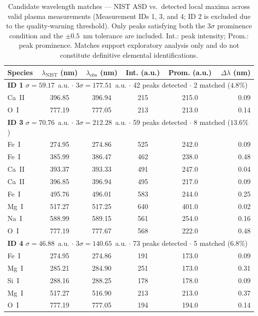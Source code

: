 \documentclass[final,5p,twocolumn,a4paper]{elsarticle}
\begin{document}
\begin{table}[!htbp]
\centering
\footnotesize
\setlength{\tabcolsep}{6pt}
\begin{tabular}{@{}lccccr@{}}
\toprule
\textbf{Species} & \textbf{$\lambda_{\mathrm{NIST}}$ (nm)} & \textbf{$\lambda_{\mathrm{obs}}$ (nm)} & \textbf{Int. (a.u.)} & \textbf{Prom. (a.u.)} & \textbf{$\Delta\lambda$ (nm)} \\
\midrule
\multicolumn{6}{l}{\textbf{ID 1} \quad $\sigma = 59.17$~a.u. $\cdot$ $3\sigma = 177.51$~a.u. $\cdot$ 42 peaks detected $\cdot$ 2 matched ($4.8\%$)} \\
\midrule
Ca~II & 396.85 & 396.94 & 215 & 215.0 & 0.09 \\
O~I   & 777.19 & 777.05 & 213 & 213.0 & 0.14 \\
\midrule
\multicolumn{6}{l}{\textbf{ID 3} \quad $\sigma = 70.76$~a.u. $\cdot$ $3\sigma = 212.28$~a.u. $\cdot$ 59 peaks detected $\cdot$ 8 matched ($13.6\%$)} \\
\midrule
Fe~I  & 274.95 & 274.86 & 525 & 242.0 & 0.09 \\
Fe~I  & 385.99 & 386.47 & 462 & 238.0 & 0.48 \\
Ca~II & 393.37 & 393.33 & 491 & 247.0 & 0.04 \\
Ca~II & 396.85 & 396.94 & 495 & 217.0 & 0.09 \\
Fe~I  & 495.76 & 496.01 & 583 & 244.0 & 0.25 \\
Mg~I  & 517.27 & 517.25 & 640 & 401.0 & 0.02 \\
Na~I  & 588.99 & 589.15 & 561 & 254.0 & 0.16 \\
O~I   & 777.19 & 777.67 & 568 & 222.0 & 0.48 \\
\midrule
\multicolumn{6}{l}{\textbf{ID 4} \quad $\sigma = 46.88$~a.u. $\cdot$ $3\sigma = 140.65$~a.u. $\cdot$ 73 peaks detected $\cdot$ 5 matched ($6.8\%$)} \\
\midrule
Fe~I  & 274.95 & 274.86 & 191 & 173.0 & 0.09 \\
Mg~I  & 285.21 & 284.90 & 251 & 173.0 & 0.31 \\
Si~I  & 288.16 & 288.25 & 178 & 178.0 & 0.09 \\
Mg~I  & 517.27 & 516.90 & 213 & 213.0 & 0.37 \\
O~I   & 777.19 & 777.05 & 194 & 194.0 & 0.14 \\
\bottomrule
\end{tabular}
\caption{Candidate wavelength matches --- NIST ASD vs.\ detected local maxima across valid plasma measurements (Measurement IDs 1, 3, and 4; ID 2 is excluded due to the quality-warning threshold). Only peaks satisfying both the $3\sigma$ prominence condition and the $\pm0.5$~nm tolerance \cite{sridhar2024libs} are included. Int.: peak intensity; Prom.: peak prominence. Matches support exploratory analysis only and do not constitute definitive elemental identifications.}
\label{table:elements}
\end{table}
\end{document}
